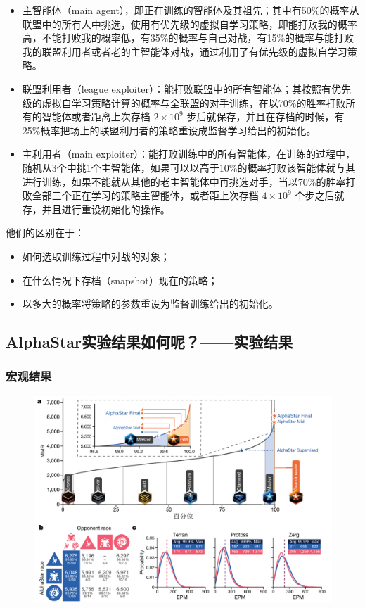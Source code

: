 \begin{itemize}
    \item 主智能体（main agent），即正在训练的智能体及其祖先；其中有50\%的概率从联盟中的所有人中挑选，使用有优先级的虚拟自学习策略，即能打败我的概率高，不能打败我的概率低，有35\%的概率与自己对战，有15\%的概率与能打败我的联盟利用者或者老的主智能体对战，通过利用了有优先级的虚拟自学习策略。
    \item 联盟利用者（league exploiter）：能打败联盟中的所有智能体；其按照有优先级的虚拟自学习策略计算的概率与全联盟的对手训练，在以70\%的胜率打败所有的智能体或者距离上次存档 $2 \times10^9$ 步后就保存，并且在存档的时候，有25\%概率把场上的联盟利用者的策略重设成监督学习给出的初始化。
    \item 主利用者（main exploiter）：能打败训练中的所有智能体，在训练的过程中，随机从3个中挑1个主智能体，如果可以以高于10\%的概率打败该智能体就与其进行训练，如果不能就从其他的老主智能体中再挑选对手，当以70\%的胜率打败全部三个正在学习的策略主智能体，或者距上次存档 $4 \times10^9 $ 个步之后就存，并且进行重设初始化的操作。
\end{itemize}


他们的区别在于：
\begin{itemize}
    \item 如何选取训练过程中对战的对象；
    \item 在什么情况下存档（snapshot）现在的策略；
    \item 以多大的概率将策略的参数重设为监督训练给出的初始化。
\end{itemize}


\subsection{AlphaStar实验结果如何呢？——实验结果} 

\subsubsection{宏观结果} 

\begin{figure}[htpb]
    \centering
    \includegraphics[width=0.5\linewidth]{res/ch13/13.7}
    \caption{}
    \label{fig:}
\end{figure}

